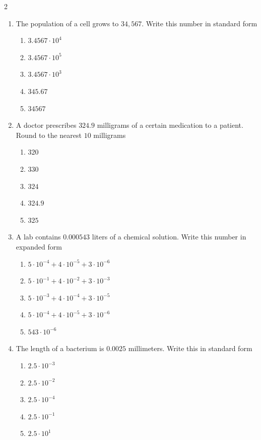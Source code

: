 \documentclass[10pt]{article}
\begin{document}
\begin{multicols}{2}
\begin{enumerate}[label=\textbf{Q\arabic*.}, leftmargin=*, itemsep=6pt, parsep=0pt]
  \item \small The population of a cell grows to $34,567$. Write this number in standard form
  \begin{enumerate}[label=(\Alph*), leftmargin=0.6cm, nosep, itemsep=2pt]
    \item $3.4567 \cdot 10^4$
    \item $3.4567 \cdot 10^5$
    \item $3.4567 \cdot 10^3$
    \item $345.67$
    \item $34567$
  \end{enumerate}

  \item \small A doctor prescribes $324.9$ milligrams of a certain medication to a patient. Round to the nearest $10$ milligrams
  \begin{enumerate}[label=(\Alph*), leftmargin=0.6cm, nosep, itemsep=2pt]
    \item $320$
    \item $330$
    \item $324$
    \item $324.9$
    \item $325$
  \end{enumerate}

  \item \small A lab contains $0.000543$ liters of a chemical solution. Write this number in expanded form
  \begin{enumerate}[label=(\Alph*), leftmargin=0.6cm, nosep, itemsep=2pt]
    \item $5 \cdot 10^{-4} + 4 \cdot 10^{-5} + 3 \cdot 10^{-6}$
    \item $5 \cdot 10^{-1} + 4 \cdot 10^{-2} + 3 \cdot 10^{-3}$
    \item $5 \cdot 10^{-3} + 4 \cdot 10^{-4} + 3 \cdot 10^{-5}$
    \item $5 \cdot 10^{-4} + 4 \cdot 10^{-5} + 3 \cdot 10^{-6}$
    \item $543 \cdot 10^{-6}$
  \end{enumerate}

  \item \small The length of a bacterium is $0.0025$ millimeters. Write this in standard form
  \begin{enumerate}[label=(\Alph*), leftmargin=0.6cm, nosep, itemsep=2pt]
    \item $2.5 \cdot 10^{-3}$
    \item $2.5 \cdot 10^{-2}$
    \item $2.5 \cdot 10^{-4}$
    \item $2.5 \cdot 10^{-1}$
    \item $2.5 \cdot 10^{1}$
  \end{enumerate}


\end{enumerate}
\end{multicols}
\end{document}
